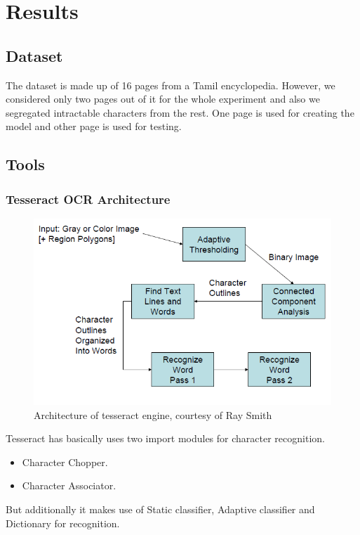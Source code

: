 \chapter{Results}

\section{Dataset}
The dataset is made up of 16 pages from a Tamil
encyclopedia. However, we considered only two pages
out of it for the whole experiment and also we segregated intractable characters from the rest.
One page is used for creating the model and other page is used for testing.

\section{Tools}
\subsection{Tesseract OCR Architecture}

\begin{figure}\centering
\includegraphics[scale=0.4]{./img/arch}
  \caption{Architecture of tesseract engine, courtesy of Ray Smith}\label{TESS}
\end{figure}

Tesseract has basically uses two import modules for character recognition.
\begin{itemize}
	\item Character Chopper.
	\item Character Associator.
\end{itemize}
But additionally it makes use of Static classifier, Adaptive classifier and Dictionary for recognition.
